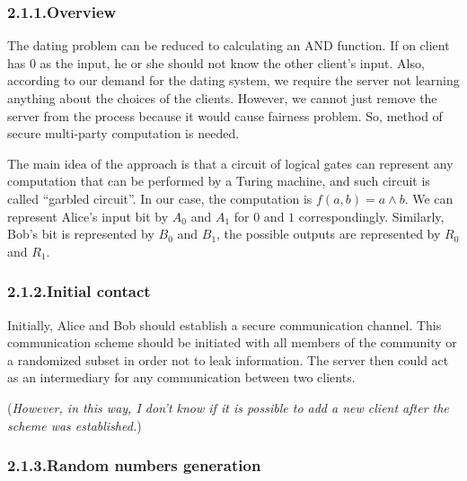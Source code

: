 \documentclass{article}
\begin{document}
\subsubsection{2.1.1.\hspace*{0.5em}Overview}\label{sec-overview}%

\noindent{}The dating problem can be reduced to calculating an AND function. If on client has 0 as the input, he or she should not know the other client’s input. Also, according to our demand for the dating system, we require the server not learning anything about the choices of the clients. However, we cannot just remove the server from the process because it would cause fairness problem. So, method of secure multi-party computation is needed.%

The main idea of the approach is that a circuit of logical gates can represent any computation that can be performed by a Turing machine, and such circuit is called “garbled circuit”. In our case, the computation is $f(a, b) = a \land b$. We can represent Alice’s input bit by $A_{0}$ and $A_{1}$ for $0$ and $1$ correspondingly. Similarly, Bob’s bit is represented by $B_{0}$ and $B_{1}$, the possible outputs are represented by $R_{0}$ and $R_{1}$.%

\subsubsection{2.1.2.\hspace*{0.5em}Initial contact}\label{sec-initial-contact}%

\noindent{}Initially, Alice and Bob should establish a secure communication channel. This communication scheme should be initiated with all members of the community or a randomized subset in order not to leak information. The server then could act as an intermediary for any communication between two clients.%

(\emph{However, in this way, I don't know if it is possible to add a new client after the scheme was established.})%

\subsubsection{2.1.3.\hspace*{0.5em}Random numbers generation}\label{sec-random-numbers-generation}%
\end{document}
